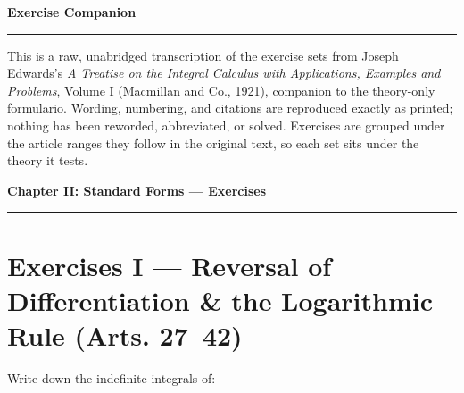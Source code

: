 \documentclass[11pt, a4paper]{article}
\begin{document}
\begin{center}
    {\LARGE \bfseries \color{accent} Exercise Companion}\\
    \vspace{0.2cm}
    {\color{accent}\rule{0.55\linewidth}{0.8pt}}
\end{center}
\vspace{0.35cm}

This is a raw, unabridged transcription of the exercise sets from Joseph Edwards's \textit{A Treatise on the Integral Calculus with Applications, Examples and Problems}, Volume I (Macmillan and Co., 1921), companion to the theory-only formulario. Wording, numbering, and citations are reproduced exactly as printed; nothing has been reworded, abbreviated, or solved. Exercises are grouped under the article ranges they follow in the original text, so each set sits under the theory it tests.

\newpage

\begin{center}
    {\LARGE \bfseries \color{accent} Chapter II: Standard Forms --- Exercises}\\
    \vspace{0.2cm}
    {\color{accent}\rule{0.55\linewidth}{0.8pt}}
\end{center}
\vspace{0.35cm}

\section*{Exercises I --- Reversal of Differentiation \& the Logarithmic Rule (Arts. 27--42)}

Write down the indefinite integrals of:
\end{document}
